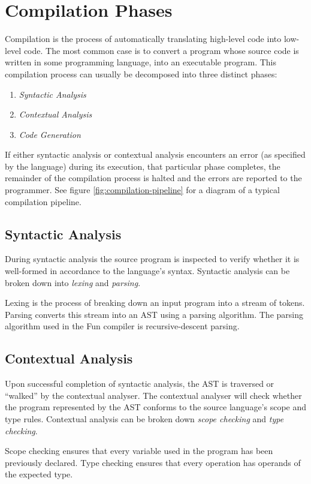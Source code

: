 \documentclass{l4proj}
\begin{document}
\section{Compilation Phases}
Compilation is the process of automatically translating high-level code into low-level code. The most common case is to convert a program whose source code is written in some programming language, into an executable program. This compilation process can usually be decomposed into three distinct phases: 
\begin{enumerate}[label=\alph*)]
\item \textit {Syntactic Analysis}
\item \textit {Contextual Analysis}
\item \textit {Code Generation}
\end{enumerate}
If either syntactic analysis or contextual analysis encounters an error (as specified by the language) during its execution, that particular phase completes, the remainder of the compilation process is halted and the errors are reported to the programmer. See figure \ref{fig:compilation-pipeline} for a diagram of a typical compilation pipeline.

\subsection{Syntactic Analysis}
During syntactic analysis the source program is inspected to verify whether it is well-formed in accordance to the language's syntax. Syntactic analysis can be broken down into \textit{lexing} and \textit{parsing}.

Lexing is the process of breaking down an input program into a stream of tokens. Parsing converts this stream into an AST using a parsing algorithm. The parsing algorithm used in the Fun compiler is recursive-descent parsing.

\subsection{Contextual Analysis}
Upon successful completion of syntactic analysis, the AST is traversed or ``walked'' by the contextual analyser. The contextual analyser will check whether the program represented by the AST conforms to the source language's scope and type rules. Contextual analysis can be broken down \textit{scope checking} and \textit{type checking}.

Scope checking ensures that every variable used in the program has been previously declared. Type checking ensures that every operation has operands of the expected type.
\end{document}
